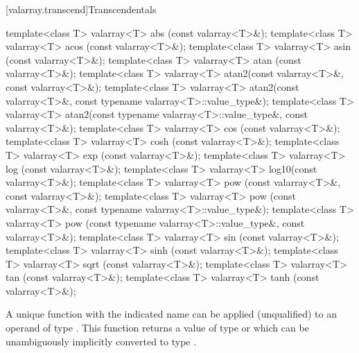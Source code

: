 [valarray.transcend]{Transcendentals}

%
%
%
%
%
%
%
%
%
%
%
%
%
%
%
%
\begin{itemdecl}
template<class T> valarray<T> abs  (const valarray<T>&);
template<class T> valarray<T> acos (const valarray<T>&);
template<class T> valarray<T> asin (const valarray<T>&);
template<class T> valarray<T> atan (const valarray<T>&);
template<class T> valarray<T> atan2(const valarray<T>&, const valarray<T>&);
template<class T> valarray<T> atan2(const valarray<T>&, const typename valarray<T>::value_type&);
template<class T> valarray<T> atan2(const typename valarray<T>::value_type&, const valarray<T>&);
template<class T> valarray<T> cos  (const valarray<T>&);
template<class T> valarray<T> cosh (const valarray<T>&);
template<class T> valarray<T> exp  (const valarray<T>&);
template<class T> valarray<T> log  (const valarray<T>&);
template<class T> valarray<T> log10(const valarray<T>&);
template<class T> valarray<T> pow  (const valarray<T>&, const valarray<T>&);
template<class T> valarray<T> pow  (const valarray<T>&, const typename valarray<T>::value_type&);
template<class T> valarray<T> pow  (const typename valarray<T>::value_type&, const valarray<T>&);
template<class T> valarray<T> sin  (const valarray<T>&);
template<class T> valarray<T> sinh (const valarray<T>&);
template<class T> valarray<T> sqrt (const valarray<T>&);
template<class T> valarray<T> tan  (const valarray<T>&);
template<class T> valarray<T> tanh (const valarray<T>&);
\end{itemdecl}

\begin{itemdescr}
\pnum
\mandates
A unique function with the indicated name can be applied (unqualified)
to an operand of type .
This function returns a value of type 
or which can be unambiguously implicitly converted to type .

\end{itemdescr}

